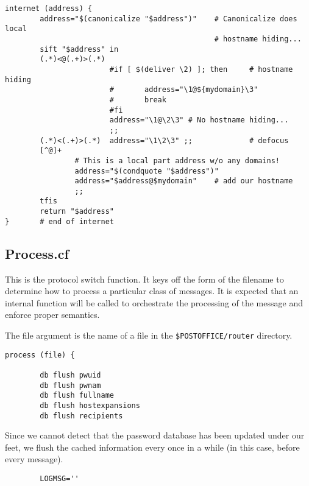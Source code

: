 \begin{verbatim}
internet (address) {
        address="$(canonicalize "$address")"    # Canonicalize does local
                                                # hostname hiding...
        sift "$address" in
        (.*)<@(.+)>(.*)
                        #if [ $(deliver \2) ]; then     # hostname hiding
                        #       address="\1@${mydomain}\3"
                        #       break
                        #fi
                        address="\1@\2\3" # No hostname hiding...
                        ;;
        (.*)<(.+)>(.*)  address="\1\2\3" ;;             # defocus
        [^@]+           
                # This is a local part address w/o any domains!
                address="$(condquote "$address")"
                address="$address@$mydomain"    # add our hostname
                ;;
        tfis
        return "$address"
}       # end of internet
\end{verbatim}





\subsection{Process.cf}

This is the protocol switch function.  It keys off the form of the filename
to determine how to process a particular class of messages.  It is expected
that an internal function will be called to orchestrate the processing of
the message and enforce proper semantics.

The file argument is the name of a file in the {\tt \$POSTOFFICE/router}
directory.
\begin{verbatim}
process (file) {

        db flush pwuid
        db flush pwnam
        db flush fullname
        db flush hostexpansions
        db flush recipients
\end{verbatim}

Since we cannot detect that the password database has been updated under
our feet, we flush the cached information every once in a while (in this
case, before every message).
\begin{verbatim}
        LOGMSG=''
\end{verbatim}

